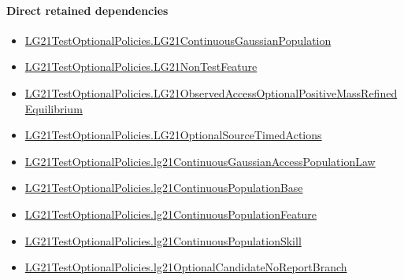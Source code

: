 \documentclass[10pt]{article}
\begin{document}
\paragraph{Direct retained dependencies}
\begin{itemize}\raggedright
\item \hyperlink{paper-prerequisite-f5e1c886d250142b}{LG21\allowbreak{}Test\allowbreak{}Optional\allowbreak{}Policies.\allowbreak{}LG21\allowbreak{}Continuous\allowbreak{}Gaussian\allowbreak{}Population}
\item \hyperlink{governing-declaration-81cb73bf3869c56d}{LG21\allowbreak{}Test\allowbreak{}Optional\allowbreak{}Policies.\allowbreak{}LG21\allowbreak{}Non\allowbreak{}Test\allowbreak{}Feature}
\item \hyperlink{governing-declaration-54d577fbb0a632ec}{LG21\allowbreak{}Test\allowbreak{}Optional\allowbreak{}Policies.\allowbreak{}LG21\allowbreak{}Observed\allowbreak{}Access\allowbreak{}Optional\allowbreak{}Positive\allowbreak{}Mass\allowbreak{}Refined\allowbreak{}Equilibrium}
\item \hyperlink{governing-declaration-c053cef5da7104c1}{LG21\allowbreak{}Test\allowbreak{}Optional\allowbreak{}Policies.\allowbreak{}LG21\allowbreak{}Optional\allowbreak{}Source\allowbreak{}Timed\allowbreak{}Actions}
\item \hyperlink{governing-declaration-fa49b6c4b938413f}{LG21\allowbreak{}Test\allowbreak{}Optional\allowbreak{}Policies.\allowbreak{}lg21\allowbreak{}Continuous\allowbreak{}Gaussian\allowbreak{}Access\allowbreak{}Population\allowbreak{}Law}
\item \hyperlink{governing-declaration-3b5146b167dee236}{LG21\allowbreak{}Test\allowbreak{}Optional\allowbreak{}Policies.\allowbreak{}lg21\allowbreak{}Continuous\allowbreak{}Population\allowbreak{}Base}
\item \hyperlink{governing-declaration-f07391974a356bb7}{LG21\allowbreak{}Test\allowbreak{}Optional\allowbreak{}Policies.\allowbreak{}lg21\allowbreak{}Continuous\allowbreak{}Population\allowbreak{}Feature}
\item \hyperlink{governing-declaration-339ce55dcb78dfb9}{LG21\allowbreak{}Test\allowbreak{}Optional\allowbreak{}Policies.\allowbreak{}lg21\allowbreak{}Continuous\allowbreak{}Population\allowbreak{}Skill}
\item \hyperlink{governing-declaration-482e8daa295d720e}{LG21\allowbreak{}Test\allowbreak{}Optional\allowbreak{}Policies.\allowbreak{}lg21\allowbreak{}Optional\allowbreak{}Candidate\allowbreak{}No\allowbreak{}Report\allowbreak{}Branch}

\end{itemize}
\end{document}
